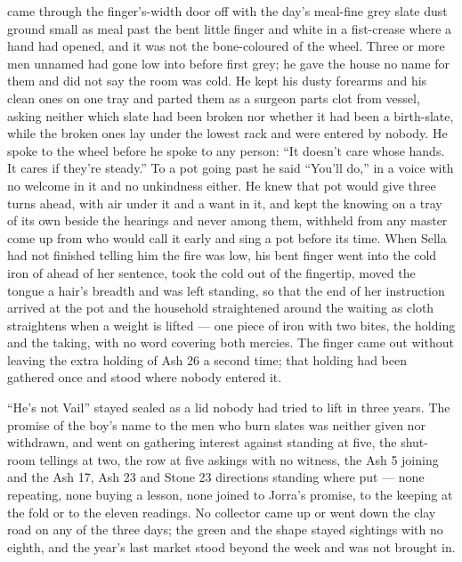  came through the finger's-width door off  with the day's meal-fine grey slate dust ground small as meal past the bent little finger and white in a fist-crease where a hand had opened, and it was not the bone-coloured  of the wheel. Three or more men unnamed had gone low into  before first grey; he gave the house no name for them and did not say the room was cold. He kept his dusty forearms and his clean ones on one tray and parted them as a surgeon parts clot from vessel, asking neither which slate had been broken nor whether it had been a birth-slate, while the broken ones lay under the lowest rack and were entered by nobody. He spoke to the wheel before he spoke to any person: “It doesn't care whose hands. It cares if they're steady.” To a pot going past he said “You'll do,” in a voice with no welcome in it and no unkindness either. He knew  that pot would give three turns ahead, with air under it and a want in it, and kept the knowing on a tray of its own beside the hearings and never among them, withheld from any master come up from  who would call it early and sing a pot before its time. When Sella had not finished telling him the fire was low, his bent finger went into the cold iron of  ahead of her sentence, took the cold out of the fingertip, moved the tongue a hair's breadth and was left standing, so that the end of her instruction arrived at the pot and the household straightened around the waiting as cloth straightens when a weight is lifted --- one piece of iron with two bites, the holding and the taking, with no  word covering both mercies. The finger came out without leaving the extra holding of Ash 26 a second time; that holding had been gathered once and stood where nobody entered it.

“He's not Vail” stayed sealed as a lid nobody had tried to lift in three years. The promise of the boy's name to the men who burn slates was neither given nor withdrawn, and went on gathering interest against  standing at five, the shut-room tellings at two, the row at five askings with no witness, the Ash 5 joining and the Ash 17, Ash 23 and Stone 23 directions standing where put --- none repeating, none buying a lesson, none joined to Jorra's promise, to the keeping at the fold or to the eleven readings. No collector came up or went down the clay road on any of the three days; the green and the shape stayed sightings with no eighth, and the year's last market stood beyond the week and was not brought in.

